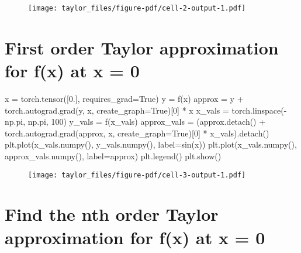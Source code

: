 \documentclass[
  letterpaper,
  DIV=11,
  numbers=noendperiod]{scrartcl}
\newenvironment{Shaded}{\begin{snugshade}}{\end{snugshade}}
\newcommand{\DecValTok}[1]{\textcolor[rgb]{0.68,0.00,0.00}{#1}}
\newcommand{\FloatTok}[1]{\textcolor[rgb]{0.68,0.00,0.00}{#1}}
\newcommand{\NormalTok}[1]{\textcolor[rgb]{0.00,0.23,0.31}{#1}}
\newcommand{\OperatorTok}[1]{\textcolor[rgb]{0.37,0.37,0.37}{#1}}
\newcommand{\StringTok}[1]{\textcolor[rgb]{0.13,0.47,0.30}{#1}}
\newcommand{\VariableTok}[1]{\textcolor[rgb]{0.07,0.07,0.07}{#1}}
\begin{document}
\begin{figure}[H]

{\centering \texttt{[image: taylor\_files/figure-pdf/cell-2-output-1.pdf]}

}

\end{figure}

\hypertarget{first-order-taylor-approximation-for-fx-at-x-0}{%
\section{First order Taylor approximation for f(x) at x =
0}\label{first-order-taylor-approximation-for-fx-at-x-0}}

\begin{Shaded}
\begin{Highlighting}[]
\NormalTok{x }\OperatorTok{=}\NormalTok{ torch.tensor([}\FloatTok{0.}\NormalTok{], requires\_grad}\OperatorTok{=}\VariableTok{True}\NormalTok{)}
\NormalTok{y }\OperatorTok{=}\NormalTok{ f(x)}
\NormalTok{approx }\OperatorTok{=}\NormalTok{ y }\OperatorTok{+}\NormalTok{ torch.autograd.grad(y, x, create\_graph}\OperatorTok{=}\VariableTok{True}\NormalTok{)[}\DecValTok{0}\NormalTok{] }\OperatorTok{*}\NormalTok{ x}
\NormalTok{x\_vals }\OperatorTok{=}\NormalTok{ torch.linspace(}\OperatorTok{{-}}\NormalTok{np.pi, np.pi, }\DecValTok{100}\NormalTok{)}
\NormalTok{y\_vals }\OperatorTok{=}\NormalTok{ f(x\_vals)}
\NormalTok{approx\_vals }\OperatorTok{=}\NormalTok{ (approx.detach() }\OperatorTok{+}\NormalTok{ torch.autograd.grad(approx, x, create\_graph}\OperatorTok{=}\VariableTok{True}\NormalTok{)[}\DecValTok{0}\NormalTok{] }\OperatorTok{*}\NormalTok{ x\_vals).detach()}
\NormalTok{plt.plot(x\_vals.numpy(), y\_vals.numpy(), label}\OperatorTok{=}\StringTok{\textquotesingle{}sin(x)\textquotesingle{}}\NormalTok{)}
\NormalTok{plt.plot(x\_vals.numpy(), approx\_vals.numpy(), label}\OperatorTok{=}\StringTok{\textquotesingle{}approx\textquotesingle{}}\NormalTok{)}
\NormalTok{plt.legend()}
\NormalTok{plt.show()}
\end{Highlighting}
\end{Shaded}

\begin{figure}[H]

{\centering \texttt{[image: taylor\_files/figure-pdf/cell-3-output-1.pdf]}

}

\end{figure}

\hypertarget{find-the-nth-order-taylor-approximation-for-fx-at-x-0}{%
\section{Find the nth order Taylor approximation for f(x) at x =
0}\label{find-the-nth-order-taylor-approximation-for-fx-at-x-0}}
\end{document}
